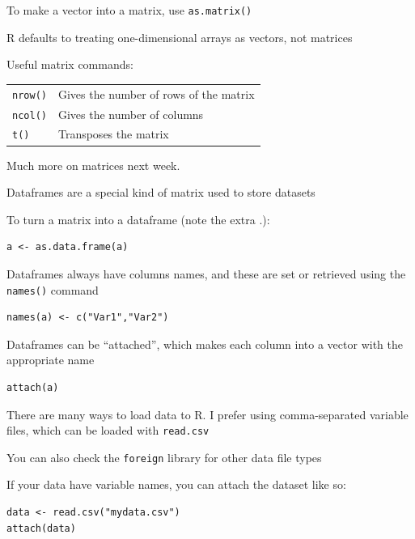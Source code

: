 \documentclass[pdflatex,landscape,titlepage]{foils}
\begin{document}
To make a vector into a matrix, use \texttt{as.matrix()}

R defaults to treating one-dimensional arrays as vectors, not matrices


Useful matrix commands:

\begin{tabular}{ll}
\texttt{nrow()}    &Gives the number of rows of the matrix\\

\texttt{ncol()}    &Gives the number of columns\\

\texttt{t()}       &Transposes the matrix\\
\end{tabular}

Much more on matrices next week.


Dataframes are a special kind of matrix used to store datasets

To turn a matrix into a dataframe (note the extra .):

\begin{verbatim}
a <- as.data.frame(a)
\end{verbatim}

Dataframes always have columns names, and these are set or retrieved using the \texttt{names()} command

\begin{verbatim}
names(a) <- c("Var1","Var2")
\end{verbatim}

Dataframes can be ``attached'', which makes each column into a vector with the appropriate name

\begin{verbatim}
attach(a)
\end{verbatim}



There are many ways to load data to R.  I prefer using comma-separated variable files, which can be loaded with \texttt{read.csv}

You can also check the \texttt{foreign} library for other data file types

If your data have variable names, you can attach the dataset like so:

\begin{verbatim}
data <- read.csv("mydata.csv")
attach(data)
\end{verbatim}
\end{document}
